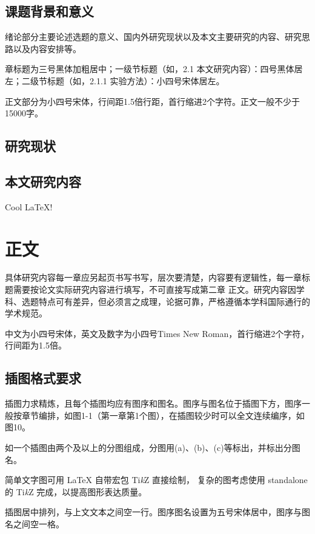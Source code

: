 \documentclass[fontset = mac ms]{seuthesis2024b}
\begin{document}
    \section{课题背景和意义}
      绪论部分主要论述选题的意义、国内外研究现状以及本文主要研究的内容、研究思路以及内容安排等。

      章标题为三号黑体加粗居中；一级节标题（如，2.1 本文研究内容）：四号黑体居左；二级节标题（如，2.1.1 实验方法）：小四号宋体居左。

      正文部分为小四号宋体，行间距1.5倍行距，首行缩进2个字符。正文一般不少于15000字。

    \section{研究现状}

    \section{本文研究内容}

      Cool \LaTeX{}!

      \lipsum

    \chapter{正文}

      具体研究内容每一章应另起页书写书写，层次要清楚，内容要有逻辑性，每一章标题需要按论文实际研究内容进行填写，不可直接写成第二章 正文。研究内容因学科、选题特点可有差异，但必须言之成理，论据可靠，严格遵循本学科国际通行的学术规范。

      中文为小四号宋体，英文及数字为小四号Times New Roman，首行缩进2个字符，行间距为1.5倍。

    \section{插图格式要求}

      插图力求精炼，且每个插图均应有图序和图名。图序与图名位于插图下方，图序一般按章节编排，如图1-1（第一章第1个图），在插图较少时可以全文连续编序，如图10。
      
      如一个插图由两个及以上的分图组成，分图用(a)、(b)、(c)等标出，并标出分图名。

      简单文字图可用 \LaTeX{} 自带宏包 Ti\textit{k}Z 直接绘制，
      复杂的图考虑使用 standalone 的 Ti\textit{k}Z 完成，以提高图形表达质量。

      插图居中排列，与上文文本之间空一行。图序图名设置为五号宋体居中，图序与图名之间空一格。
\end{document}
